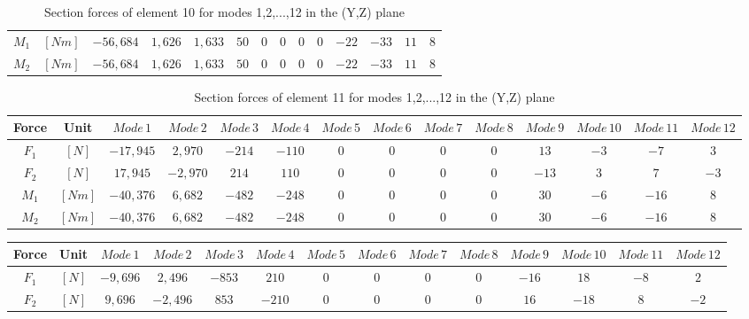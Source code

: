 \documentclass[11pt,a4paper,titlepage]{report}
\begin{document}
\begin{appendix}
\begin{landscape}
\begin{table}[]
\begin{tiny}
\begin{tabular}{c|c|c|c|c|c|c|c|c|c|c|c|c|c}
    $M_1$ & $[Nm]$ & $ -56,684$ & $1,626$ & $1,633$ & $50$ & $0$ & $0$ & $0$ & $0$ & $-22$ & $-33$ & $11$ &  $8$\\
    $M_2$ & $[Nm]$ & $ -56,684$ & $1,626$ & $1,633$ & $50$ & $0$ & $0$ & $0$ & $0$ & $-22$ & $-33$ & $11$ &  $8$\\
        \end{tabular}
        \end{tiny}
    \caption{Section forces of element 10 for modes 1,2,...,12 in the (Y,Z) plane}
    \label{tab:my_label}
\end{table}
\begin{table}[]
    \centering
    \begin{tiny}
    \begin{tabular}{c|c|c|c|c|c|c|c|c|c|c|c|c|c}
    Force & Unit & $Mode\,1$ & $Mode\,2$ & $Mode\,3$ & $Mode\,4$ & $Mode\,5$ & $Mode\,6$ & $Mode\,7$ & $Mode\,8$ & $Mode\,9$ & $Mode\,10$ & $Mode\,11$ & $Mode\,12$\\
    \hline
   $F_1$ & $[N]$ & $-17,945$ & $ 2,970$ & $-214$ & $-110$ & $0$ & $0$ & $0$ & $0$ & $13$ & $-3$ & $-7$ &  $3$\\
   $F_2$ & $[N]$ & $17,945$ & $-2,970$ & $214$ & $110$ & $0$ & $0$ & $0$ & $0$ & $-13$ & $3$ & $7$ &  $-3$\\
    $M_1$ & $[Nm]$ & $-40,376$ & $6,682$ & $-482$ & $-248$ & $0$ & $0$ & $0$ & $0$ & $30$ & $-6$ & $-16$ &  $8$\\
    $M_2$ & $[Nm]$ & $-40,376$ & $6,682$ & $-482$ & $-248$ & $0$ & $0$ & $0$ & $0$ & $30$ & $-6$ & $-16$ &  $8$\\
        \end{tabular}
        \end{tiny}
    \caption{Section forces of element 11 for modes 1,2,...,12 in the (Y,Z) plane}
    \label{tab:my_label}
\end{table}
\begin{table}[]
    \centering
    \begin{tiny}
    \begin{tabular}{c|c|c|c|c|c|c|c|c|c|c|c|c|c}
    Force & Unit & $Mode\,1$ & $Mode\,2$ & $Mode\,3$ & $Mode\,4$ & $Mode\,5$ & $Mode\,6$ & $Mode\,7$ & $Mode\,8$ & $Mode\,9$ & $Mode\,10$ & $Mode\,11$ & $Mode\,12$\\
    \hline
   $F_1$ & $[N]$ & $-9,696$ & $ 2,496$ & $-853$ & $210$ & $0$ & $0$ & $0$ & $0$ & $-16$ & $18$ & $-8$ &  $2$\\
   $F_2$ & $[N]$ & $9,696$ & $-2,496$ & $853$ & $-210$ & $0$ & $0$ & $0$ & $0$ & $16$ & $-18$ & $8$ &  $-2$\\

\end{tabular}
\end{tiny}
\end{table}
\end{landscape}
\end{appendix}
\end{document}
